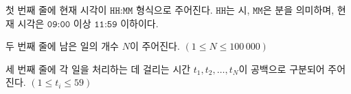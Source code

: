 첫 번째 줄에 현재 시각이 $\texttt{HH:MM}$ 형식으로 주어진다. $\texttt{HH}$는 시, $\texttt{MM}$은 분을 의미하며, 현재 시각은 $\texttt{09:00}$ 이상 $\texttt{11:59}$ 이하이다.

두 번째 줄에 남은 일의 개수 $N$이 주어진다. $(1 \le N \le 100\,000)$

세 번째 줄에 각 일을 처리하는 데 걸리는 시간 $t_1,t_2,\ldots,t_N$이 공백으로 구분되어 주어진다. $(1 \le t_i \le 59)$